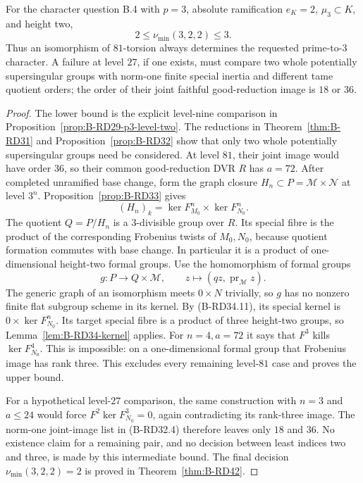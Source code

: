 \begin{theorem}
\label{thm:B-RD34}
For the character question B.4 with $p=3$, absolute ramification
$e_K=2$, $\mu_3\subset K$, and height two,
\[
                         2\leq\nu_{\min}(3,2,2)\leq3.
                                                        \tag{B-RD34.10}
\]
Thus an isomorphism of $81$-torsion always determines the requested
prime-to-$3$ character. A failure at level $27$, if one exists,
must compare two whole potentially supersingular groups with
norm-one finite special inertia and different tame quotient orders;
the order of their joint faithful good-reduction image is $18$ or
$36$.
\end{theorem}
\begin{proof}
The lower bound is the explicit level-nine comparison in
Proposition~\ref{prop:B-RD29-p3-level-two}. The reductions in
Theorem~\ref{thm:B-RD31} and Proposition~\ref{prop:B-RD32} show
that only two whole potentially supersingular groups need be
considered. At level $81$, their joint image would have order
$36$, so their common good-reduction DVR $R$ has $a=72$.
After completed unramified base change, form the graph closure
$H_n\subset P=\mathcal M\times\mathcal N$ at level $3^n$.
Proposition~\ref{prop:B-RD33} gives
\[
       (H_n)_k=\ker F_{M_0}^n\times\ker F_{N_0}^n.
                                                        \tag{B-RD34.11}
\]
The quotient $Q=P/H_n$ is a $3$-divisible group over $R$.
Its special fibre is the product of the corresponding Frobenius
twists of $M_0,N_0$, because quotient formation commutes with base
change. In particular it is a product of one-dimensional
height-two formal groups. Use the homomorphism of formal groups
\[
 g:P\longrightarrow Q\times\mathcal M,
                 \qquad z\longmapsto(qz,\operatorname{pr}_{\mathcal M}z).
                                                        \tag{B-RD34.12}
\]
The generic graph of an isomorphism meets $0\times N$ trivially,
so $g$ has no nonzero finite flat subgroup scheme in its kernel.
By (B-RD34.11), its special kernel is
$0\times\ker F_{N_0}^{n}$. Its target special fibre is a product
of three height-two groups, so Lemma~\ref{lem:B-RD34-kernel}
applies. For $n=4,a=72$ it says that $F^3$ kills
$\ker F_{N_0}^4$. This is impossible: on a one-dimensional formal
group that Frobenius image has rank three. This excludes every
remaining level-$81$ case and proves the upper bound.

For a hypothetical level-$27$ comparison, the same construction
with $n=3$ and $a\leq24$ would force $F^2\ker F_{N_0}^3=0$,
again contradicting its rank-three image. The norm-one joint-image
list in (B-RD32.4) therefore leaves only $18$ and $36$. No
existence claim for a remaining pair, and no decision between
least indices two and three, is made by this intermediate bound.
The final decision $\nu_{\min}(3,2,2)=2$ is proved in
Theorem~\ref{thm:B-RD42}.
\end{proof}

